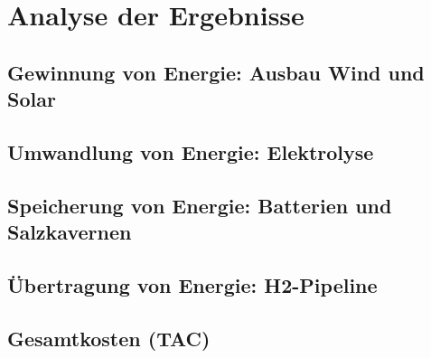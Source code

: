 \section{Analyse der Ergebnisse}

\subsection{Gewinnung von Energie: Ausbau Wind und Solar}

\subsection{Umwandlung von Energie: Elektrolyse}

\subsection{Speicherung von Energie: Batterien und Salzkavernen}

\subsection{Übertragung von Energie: H2-Pipeline}

\subsection{Gesamtkosten (TAC)}





